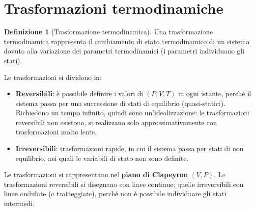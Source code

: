 \documentclass[11pt, a4paper, openright]{book}
\theoremstyle{plain}
\theoremstyle{definition}
\newtheorem{definizione}[teorema]{Definizione}
\theoremstyle{remark}
\begin{document}
\section{Trasformazioni termodinamiche}
\begin{definizione}[Trasformazione termodinamica]
    Una trasformazione termodinamica rappresenta il cambiamento di stato termodinamico di un sistema dovuto alla variazione dei parametri termodinamici (i parametri individuano gli stati).
\end{definizione}
Le trasformazioni si dividono in:
\begin{itemize}
    \item \textbf{Reversibili}: è possibile definire i valori di $(P, V, T)$ in ogni istante, perché il sistema passa per una successione di stati di equilibrio (quasi-statici). Richiedono un tempo infinito, quindi sono un'idealizzazione: le trasformazioni reversibili non esistono, si realizzano solo approssimativamente con trasformazioni molto lente.
    \item \textbf{Irreversibili}: trasformazioni rapide, in cui il sistema passa per stati di non equilibrio, nei quali le variabili di stato non sono definite.
\end{itemize}
Le trasformazioni si rappresentano nel \textbf{piano di Clapeyron} $(V, P)$. Le trasformazioni reversibili si disegnano con linee continue; quelle irreversibili con linee ondulate (o tratteggiate), perché non è possibile individuare gli stati intermedi.
\end{document}
